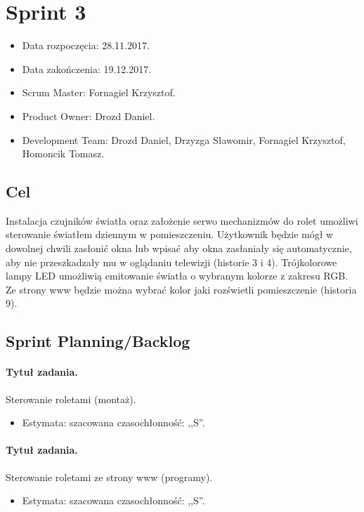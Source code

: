 \section{Sprint 3}
\begin{itemize}
	\item Data rozpoczęcia: 28.11.2017.
	\item Data zakończenia: 19.12.2017.
	\item Scrum Master: Fornagiel Krzysztof.
	\item Product Owner: Drozd Daniel.
	\item Development Team: Drozd Daniel, Drzyzga Sławomir, Fornagiel Krzysztof, Homoncik Tomasz.
\end{itemize}
\subsection{Cel} 


Instalacja czujników światła oraz założenie serwo mechanizmów do rolet umożliwi sterowanie światłem dziennym w pomieszczeniu. Użytkownik będzie mógł w dowolnej chwili zasłonić okna lub wpisać aby okna zasłaniały się automatycznie, aby nie przeszkadzały mu w oglądaniu telewizji (historie 3 i 4). Trójkolorowe lampy LED umożliwią emitowanie światła o wybranym kolorze z zakresu RGB. Ze strony www będzie można wybrać kolor jaki rozświetli pomieszczenie (historia 9).



\subsection{Sprint Planning/Backlog}

\paragraph{Tytuł zadania.} Sterowanie roletami (montaż).
\begin{itemize}
	\item Estymata: szacowana czasochłonność: ,,S''.
\end{itemize}

\paragraph{Tytuł zadania.} Sterowanie roletami ze strony www (programy).
\begin{itemize}
	\item Estymata: szacowana czasochłonność: ,,S''.
\end{itemize}

